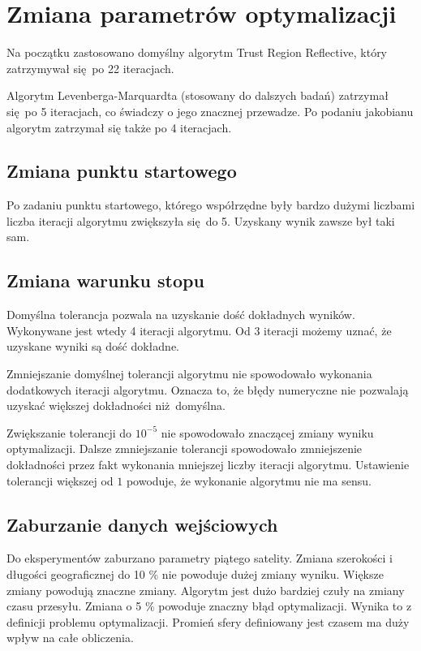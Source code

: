 \documentclass[]{article}
\begin{document}
\section{Zmiana parametrów optymalizacji}
Na początku zastosowano domyślny algorytm Trust Region Reflective, który zatrzymywał się po 22 iteracjach. 

Algorytm Levenberga-Marquardta (stosowany do dalszych badań) zatrzymał się po 5 iteracjach, co świadczy o jego znacznej przewadze. Po podaniu jakobianu 
algorytm zatrzymał się także po 4 iteracjach.

\subsection{Zmiana punktu startowego}
Po zadaniu punktu startowego, którego współrzędne były bardzo dużymi liczbami liczba iteracji algorytmu zwiększyła się do 5. Uzyskany wynik zawsze był taki sam.
\subsection{Zmiana warunku stopu}
Domyślna tolerancja pozwala na uzyskanie dość dokładnych wyników. Wykonywane jest wtedy 4 iteracji algorytmu. Od 3 iteracji możemy uznać, że uzyskane wyniki są dość dokładne.

Zmniejszanie domyślnej tolerancji algorytmu nie spowodowało wykonania dodatkowych iteracji algorytmu. Oznacza to, że błędy numeryczne nie pozwalają uzyskać większej dokładności niż domyślna. 

Zwiększanie tolerancji do $10^{-5}$ nie spowodowało znaczącej zmiany wyniku optymalizacji. Dalsze zmniejszanie tolerancji spowodowało zmniejszenie dokładności przez fakt wykonania mniejszej liczby iteracji algorytmu. Ustawienie tolerancji większej od $1$ powoduje, że wykonanie algorytmu nie ma sensu.

\subsection{Zaburzanie danych wejściowych}
Do eksperymentów zaburzano parametry piątego satelity. Zmiana szerokości i długości geograficznej do 10 \% nie powoduje dużej zmiany wyniku. Większe zmiany powodują znaczne zmiany. Algorytm jest dużo bardziej czuły na zmiany czasu przesyłu. Zmiana o 5 \% powoduje znaczny błąd optymalizacji. Wynika to z definicji problemu optymalizacji. Promień sfery definiowany jest czasem ma duży wpływ na całe obliczenia.
\end{document}
